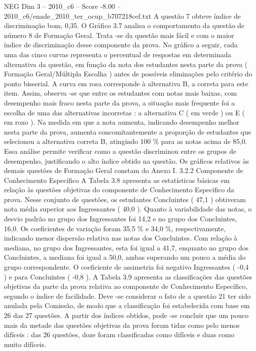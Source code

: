\begin{textsample}{NEG Dim 3 – 2010\_c6 – Score -8.00 – 2010\_c6/enade\_2010\_ter\_ocup\_b707218cef.txt}
A questão 7 obteve índice de discriminação bom, 0,35.
O Gráfico 3.7 analisa o comportamento da questão de número 8 de Formação Geral.
Trata -se da questão mais fácil e com o maior índice de discriminação desse componente da prova.
No gráfico a seguir, cada uma das cinco curvas representa o percentual de respostas em determinada alternativa da questão, em função da nota dos estudantes nesta parte da prova ( Formação Geral/Múltipla Escolha ) antes de possíveis eliminações pelo critério do ponto bisserial.
A curva em rosa corresponde à alternativa B, a correta para este item.
Assim, observa -se que entre os estudantes com notas mais baixas, com desempenho mais fraco nesta parte da prova, a situação mais frequente foi a escolha de uma das alternativas incorretas : a alternativa C ( em verde ) ou E ( em roxo ).
Na medida em que a nota aumenta, indicando desempenho melhor nesta parte da prova, aumenta concomitantemente a proporção de estudantes que selecionou a alternativa correta B, atingindo 100 \% para as notas acima de 85,0.
Essa análise permite verificar como a questão discriminou entre os grupos de desempenho, justificando o alto índice obtido na questão.
Os gráficos relativos às demais questões de Formação Geral constam do Anexo I. 3.2.2 Componente de Conhecimento Específico A Tabela 3.8 apresenta as estatísticas básicas em relação às questões objetivas do componente de Conhecimento Específico da prova.
Nesse conjunto de questões, os estudantes Concluintes ( 47,1 ) obtiveram nota média superior aos Ingressantes ( 40,0 ).
Quanto à variabilidade das notas, o desvio padrão no grupo dos Ingressantes foi 14,2 e no grupo dos Concluintes, 16,0.
Os coeficientes de variação foram 35,5 \% e 34,0 \%, respectivamente, indicando menor dispersão relativa nas notas dos Concluintes.
Com relação à mediana, no grupo dos Ingressantes, esta foi igual a 41,7, enquanto no grupo dos Concluintes, a mediana foi igual a 50,0, ambas superando um pouco a média do grupo correspondente.
O coeficiente de assimetria foi negativo Ingressantes ( -0,4 ) e para Concluintes ( -0,8 ).
A Tabela 3.9 apresenta as classificações das questões objetivas da parte da prova relativa ao componente de Conhecimento Específico, segundo o índice de facilidade.
Deve -se considerar o fato de a questão 21 ter sido anulada pela Comissão, de modo que a classificação foi estabelecida com base em 26 das 27 questões.
A partir dos índices obtidos, pode -se concluir que um pouco mais da metade das questões objetivas da prova foram tidas como pelo menos difíceis : das 26 questões, doze foram classificadas como difíceis e duas como muito difíceis.

\end{textsample}
